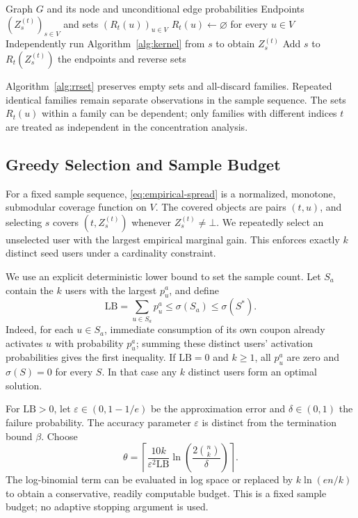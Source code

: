 \documentclass[sigconf]{acmart}
\begin{document}
\begin{algorithm}[t]
\caption{Generate One Family of Reverse Sets}
\label{alg:rrset}
\begin{algorithmic}[1]
\Require Graph $G$ and its node and unconditional edge probabilities
\Ensure Endpoints $(Z_s^{(t)})_{s\in V}$ and sets $(R_t(u))_{u\in V}$
\State $R_t(u)\gets\varnothing$ for every $u\in V$
  \State Independently run Algorithm~\ref{alg:kernel} from $s$
    to obtain $Z_s^{(t)}$
    \State Add $s$ to $R_t(Z_s^{(t)})$
  \EndIf
\EndFor
\State \Return the endpoints and reverse sets
\end{algorithmic}
\end{algorithm}

Algorithm~\ref{alg:rrset} preserves empty sets and all-discard families.
Repeated identical families remain separate observations in the sample
sequence. The sets $R_t(u)$ within a family can be dependent; only
families with different indices $t$ are treated as independent in the
concentration analysis.

\subsection{Greedy Selection and Sample Budget}

For a fixed sample sequence, \eqref{eq:empirical-spread} is a normalized,
monotone, submodular coverage function on $V$. The covered objects are
pairs $(t,u)$, and selecting $s$ covers $(t,Z_s^{(t)})$ whenever
$Z_s^{(t)}\ne\bot$. We repeatedly select an unselected user with the
largest empirical marginal gain. This enforces exactly $k$ distinct
seed users under a cardinality constraint.

We use an explicit deterministic lower bound to set the sample count.
Let $S_a$ contain the $k$ users with the largest $p_u^a$, and define
\begin{equation}
\label{eq:opt-lower-bound}
  \mathrm{LB}=\sum_{u\in S_a}p_u^a\leq\sigma(S_a)\leq\sigma(S^*).
\end{equation}
Indeed, for each $u\in S_a$, immediate consumption of its own coupon
already activates $u$ with probability $p_u^a$; summing these distinct
users' activation probabilities gives the first inequality. If $\mathrm{LB}=0$
and $k\geq1$, all $p_u^a$ are zero and $\sigma(S)=0$ for every $S$.
In that case any $k$ distinct users form an optimal solution.

For $\mathrm{LB}>0$, let $\varepsilon\in(0,1-1/e)$ be the approximation error and
$\delta\in(0,1)$ the failure probability. The accuracy parameter $\varepsilon$ is distinct
from the termination bound $\beta$. Choose
\begin{equation}
\label{eq:sample-budget}
  \theta=\left\lceil
    \frac{10k}{\varepsilon^2\mathrm{LB}}
    \ln\!\left(\frac{2\binom{n}{k}}{\delta}\right)
  \right\rceil.
\end{equation}
The log-binomial term can be evaluated in log space or replaced by
$k\ln(en/k)$ to obtain a conservative, readily computable budget.
This is a fixed sample budget; no adaptive stopping argument is used.
\end{document}
